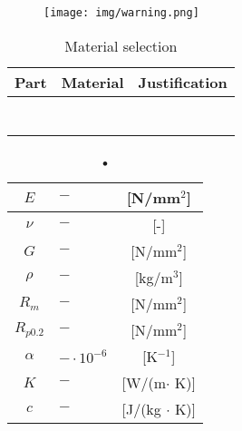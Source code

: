 

\begin{figure}[!h]
	\begin{center}
		\texttt{[image: img/warning.png]}
	\end{center}
\end{figure}



\begin{table}[!h]
	\begin{center}
		\begin{tabular}{lll}
		\hline
		\textbf{Part} & \textbf{Material} & \textbf{Justification}\\
		\hline
		 &  & \\
		\hline
		 &  & \\
		\hline
		 &  & \\
		\hline
		 &  & \\
		\hline
		 &  & \\
		\hline
		 &  & \\
		\hline
		 &  & \\
		\hline
		\end{tabular}
		\caption{Material selection}
		\label{tab_materialSelectionTab01}
	\end{center}
\end{table}



\begin{table}[!h]
	\begin{center}
	\begin{tabular}{clc}
	\hline
	$E$ & $-$ &[N/mm$^2$]\\ 				%
	\hline
	$\nu$ & $-$ & [-]\\						%
	\hline
	$G$ & $-$ & [N/mm$^2$]\\				%
	\hline
	$\rho$ & $-$ & [kg/m$^3$]\\				%
	\hline
	$R_m$ & $-$ & [N/mm$^2$]\\ 				%
	\hline
	$R_{p0.2}$ & $-$ & [N/mm$^2$]\\ 		%
	\hline
	$\alpha$ & $-\cdot 10^{-6}$ & [K$^{-1}$]\\			%
	\hline
	$K$ & $-$ & [W/(m$\cdot$ K)]\\ 			%
	\hline
	$c$ & $-$ & [J/(kg $\cdot$ K)]\\		%
	\hline
	\end{tabular}
	\caption{•} %
	\label{mat_}
	\end{center}
\end{table}

